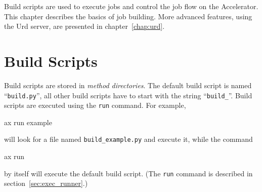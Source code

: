 
\label{chap:urd_basic}

Build scripts are used to execute jobs and control the job flow on the
Accelerator.  This chapter describes the basics of job building.  More
advanced features, using the Urd server, are presented in
chapter~\ref{chap:urd}.



\section{Build Scripts}
Build scripts are stored in \textsl{method directories}.  The default
build script is named ``\texttt{build.py}'', all other build scripts
have to start with the string ``\texttt{build\_}''.  Build scripts are
executed using the \texttt{run} command.  For example,
\begin{shell}
ax run example
\end{shell}
will look for a file named \texttt{build\_example.py} and execute it,
while the command
\begin{shell}
ax run
\end{shell}
by itself will execute the default build script.  (The \texttt{run}
command is described in section~\ref{sec:exec_runner}.)

